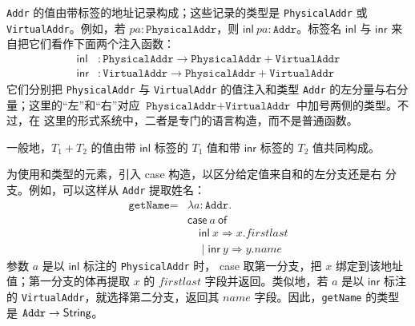 \texttt{Addr} 的值由带标签的地址记录构成；这些记录的类型是
\texttt{PhysicalAddr} 或 \texttt{VirtualAddr}。例如，若
\(\mathit{pa}:\texttt{PhysicalAddr}\)，则
\(\mathsf{inl}\ \mathit{pa}:\texttt{Addr}\)。标签名 \(\mathsf{inl}\)
与 \(\mathsf{inr}\) 来自把它们看作下面两个注入函数：
\[
\begin{aligned}
\mathsf{inl}&:\texttt{PhysicalAddr}\to
  \texttt{PhysicalAddr}+\texttt{VirtualAddr}\\
\mathsf{inr}&:\texttt{VirtualAddr}\to
  \texttt{PhysicalAddr}+\texttt{VirtualAddr}
\end{aligned}
\]
它们分别把 \texttt{PhysicalAddr} 与 \texttt{VirtualAddr} 的值注入和类型
\texttt{Addr} 的左分量与右分量；这里的“左”和“右”对应
\(\texttt{PhysicalAddr}+\texttt{VirtualAddr}\) 中加号两侧的类型。不过，在
这里的形式系统中，二者是专门的语言构造，而不是普通函数。

一般地，\(T_1+T_2\) 的值由带 \(\mathsf{inl}\) 标签的 \(T_1\) 值和带
\(\mathsf{inr}\) 标签的 \(T_2\) 值共同构成。

为使用和类型的元素，引入 case 构造，以区分给定值来自和的左分支还是右
分支。例如，可以这样从 \texttt{Addr} 提取姓名：
\[
\begin{aligned}
\texttt{getName}={}&\lambda a:\texttt{Addr}.\\
&\mathsf{case}\ a\ \mathsf{of}\\
&\quad\mathsf{inl}\ x\Rightarrow x.\mathit{firstlast}\\
&\quad\mid\mathsf{inr}\ y\Rightarrow y.\mathit{name}
\end{aligned}
\]
参数 \(a\) 是以 \(\mathsf{inl}\) 标注的 \texttt{PhysicalAddr} 时，
case 取第一分支，把 \(x\) 绑定到该地址值；第一分支的体再提取
\(x\) 的 \(\mathit{firstlast}\) 字段并返回。类似地，若 \(a\) 是以
\(\mathsf{inr}\) 标注的 \texttt{VirtualAddr}，就选择第二分支，返回其
\(\mathit{name}\) 字段。因此，\texttt{getName} 的类型是
\(\texttt{Addr}\to\mathsf{String}\)。

